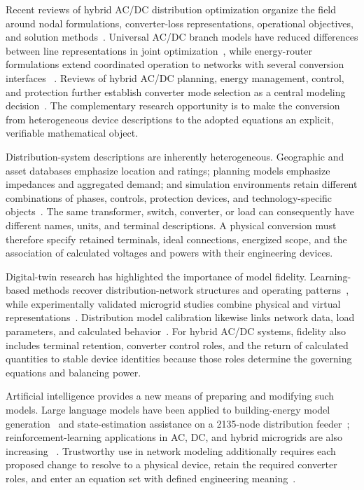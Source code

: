 \documentclass[final,5p,times,twocolumn]{elsarticle}
\begin{document}
Recent reviews of hybrid AC/DC distribution optimization organize the field
around nodal formulations, converter-loss representations, operational
objectives, and solution methods~\cite{altorok2024opf}. Universal AC/DC branch
models have reduced differences between line representations in joint
optimization~\cite{shahbazi2025branch}, while energy-router formulations extend
coordinated operation to networks with several conversion interfaces
~\cite{zhu2024router}. Reviews of hybrid AC/DC planning, energy management,
control, and protection further establish converter mode selection as a central
modeling decision~\cite{abdelwanis2024review}. The complementary research
opportunity is to make the conversion from heterogeneous device descriptions to
the adopted equations an explicit, verifiable mathematical object.

Distribution-system descriptions are inherently heterogeneous. Geographic and
asset databases emphasize location and ratings; planning models emphasize
impedances and aggregated demand; and simulation environments retain different
combinations of phases, controls, protection devices, and technology-specific
objects~\cite{gridlabd,opendss,pmd,ravikumar2017cim}. The same transformer,
switch, converter, or load can consequently have different names, units, and
terminal descriptions. A physical conversion must therefore specify retained
terminals, ideal connections, energized scope, and the association of calculated
voltages and powers with their engineering devices.

Digital-twin research has highlighted the importance of model fidelity.
Learning-based methods recover distribution-network structures and operating
patterns~\cite{hua2023dt}, while experimentally validated microgrid studies
combine physical and virtual representations~\cite{sifat2025dt}. Distribution
model calibration likewise links network data, load parameters, and calculated
behavior~\cite{liang2010validation}. For hybrid AC/DC systems, fidelity also
includes terminal retention, converter control roles, and the return of
calculated quantities to stable device identities because those roles determine
the governing equations and balancing power.

Artificial intelligence provides a new means of preparing and modifying such
models. Large language models have been applied to building-energy model
generation~\cite{jiang2024eplusllm} and state-estimation assistance on a
2135-node distribution feeder~\cite{li2026llm}; reinforcement-learning
applications in AC, DC, and hybrid microgrids are also increasing
~\cite{nasir2025rlreview}. Trustworthy use in network modeling additionally
requires each proposed change to resolve to a physical device, retain the
required converter roles, and enter an equation set with defined engineering
meaning~\cite{madani2025llm,ruan2024security,zhang2025llmreview}.
\end{document}

